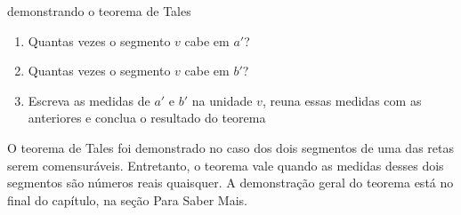 \begin{task}{demonstrando o teorema de Tales}
\begin{enumerate}
\item {} 
Quantas vezes o segmento \(v\) cabe em \(a'\)?

\item {} 
Quantas vezes o segmento \(v\) cabe em \(b'\)?

\item {} 
Escreva as medidas de \(a'\) e \(b'\) na unidade \(v\), reuna essas medidas com as anteriores e conclua o resultado do teorema

\end{enumerate}
\end{task}



\begin{observation}

O teorema de Tales foi demonstrado no caso dos dois segmentos de uma das retas serem comensuráveis. Entretanto, o teorema vale quando as medidas desses dois segmentos são números reais quaisquer. A demonstração geral do teorema está no final do capítulo, na seção Para Saber Mais.
\end{observation}

